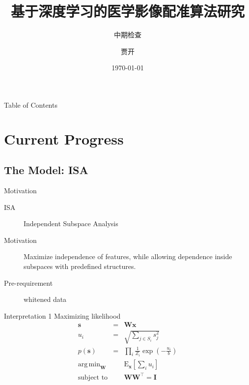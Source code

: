 \documentclass {beamer}
\title{基于深度学习的医学影像配准算法研究}
\subtitle{中期检查}
\author {贾开}
\institute {清华大学}
\date{\today}
\DeclareMathOperator*{\argmin}{arg\,min}
\newcommand{\trans}[1]{#1^\intercal}
\renewcommand{\vec}[1]{\boldsymbol{#1}}
\begin{document}



\begin{frame}{Table of Contents}
    \tableofcontents
\end{frame}

\section{Current Progress}

\subsection{The Model: ISA}
\begin{frame}{Motivation}
    \begin{description}
        \item[ISA] Independent Subspace Analysis
        \item[Motivation] Maximize independence of features, while allowing
            dependence inside subspaces with predefined structures.
        \item[Pre-requirement] whitened data
    \end{description}
\end{frame}

\begin{frame}{Interpretation 1}
    Maximizing likelihood
    \begin{eqnarray*}
        \vec{s} &=& \vec{Wx} \\
        u_i &=& \sqrt{\sum_{j \in S_i}s_j^2} \\
        p(\vec{s}) &=& \prod_i{\frac{1}{Z_i}\exp\left(-\frac{u_i}{b}\right)} \\
        \argmin_{\vec{W}} && \text{E}_{\vec{x}}\left[\sum_i u_i\right] \\
        \text{subject to} && \vec{W}\trans{\vec{W}} = \vec{I}
    \end{eqnarray*}
\end{frame}
\end{document}
